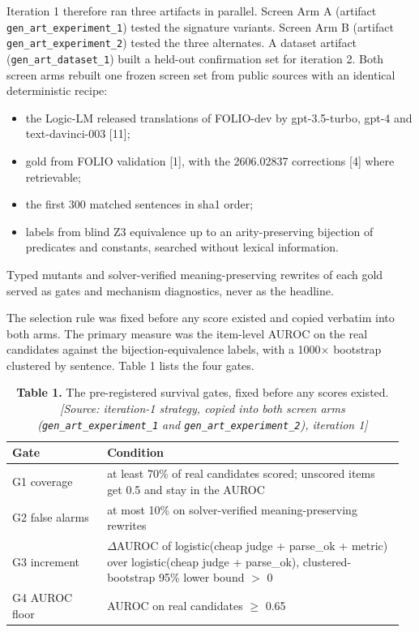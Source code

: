 \documentclass[11pt,letterpaper]{article}
\begin{document}
Iteration 1 therefore ran three artifacts in parallel. Screen Arm A (artifact \texorpdfstring{\textup{\nolinkurl{gen_art_experiment_1}}}{gen art experiment 1}) tested the signature variants. Screen Arm B (artifact \texorpdfstring{\textup{\nolinkurl{gen_art_experiment_2}}}{gen art experiment 2}) tested the three alternates. A dataset artifact (\texorpdfstring{\textup{\nolinkurl{gen_art_dataset_1}}}{gen art dataset 1}) built a held-out confirmation set for iteration 2. Both screen arms rebuilt one frozen screen set from public sources with an identical deterministic recipe:

\begin{itemize}
\item {}the Logic-LM released translations of FOLIO-dev by gpt-3.5-turbo, gpt-4 and text-davinci-003 [11];
\item {}gold from FOLIO validation [1], with the 2606.02837 corrections [4] where retrievable;
\item {}the first 300 matched sentences in sha1 order;
\item {}labels from blind Z3 equivalence up to an arity-preserving bijection of predicates and constants, searched without lexical information.
\end{itemize}
Typed mutants and solver-verified meaning-preserving rewrites of each gold served as gates and mechanism diagnostics, never as the headline.

The selection rule was fixed before any score existed and copied verbatim into both arms. The primary measure was the item-level AUROC on the real candidates against the bijection-equivalence labels, with a 1000$\times$ bootstrap clustered by sentence. Table 1 lists the four gates.

\begin{table}[H]
\centering
\small
\setlength{\tabcolsep}{3pt}
\caption*{\textbf{Table 1.} The pre-registered survival gates, fixed before any scores existed. \textit{[Source: iteration-1 strategy, copied into both screen arms (\texorpdfstring{\textup{\nolinkurl{gen_art_experiment_1}}}{gen art experiment 1} and \texorpdfstring{\textup{\nolinkurl{gen_art_experiment_2}}}{gen art experiment 2}), iteration 1]}}
\begin{tabular}{>{\raggedright\arraybackslash}p{0.239\linewidth}>{\raggedright\arraybackslash}p{0.726\linewidth}}
\toprule
\textbf{Gate} & \textbf{Condition} \\
\midrule
{}G1 coverage & at least 70\% of real candidates scored; unscored items get 0.5 and stay in the AUROC \\
{}G2 false alarms & at most 10\% on solver-verified meaning-preserving rewrites \\
{}G3 increment & $\Delta$AUROC of logistic(cheap judge + parse\_\allowbreak{}ok + metric) over logistic(cheap judge + parse\_\allowbreak{}ok), clustered-bootstrap 95\% lower bound $>$ 0 \\
{}G4 AUROC floor & AUROC on real candidates $\geq$ 0.65 \\
\bottomrule
\end{tabular}
\end{table}
\end{document}

